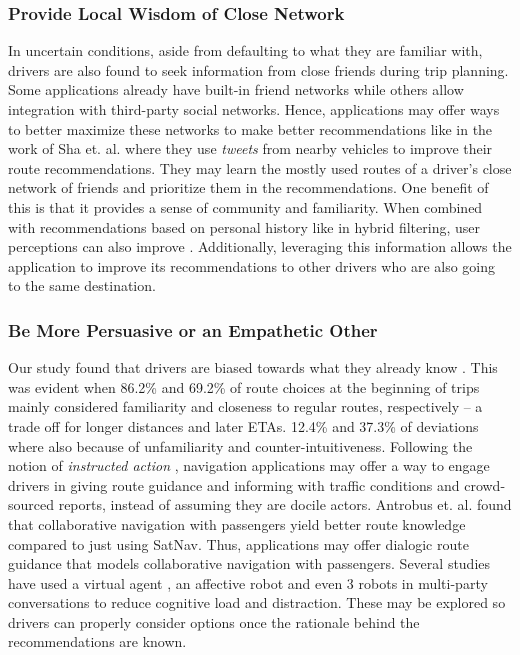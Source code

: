 \subsubsection{Provide Local Wisdom of Close Network}
In uncertain conditions, aside from defaulting to what they are familiar with, drivers are also found to seek information from close friends during trip planning. Some applications already have built-in friend networks while others allow integration with third-party social networks. Hence, applications may offer ways to better maximize these networks to make better recommendations like in the work of Sha et. al. \cite{Sha2013SocialNavigation} where they use \emph{tweets} from nearby vehicles to improve their route recommendations. They may learn the mostly used routes of a driver's close network of friends and prioritize them in the recommendations. One benefit of this is that it provides a sense of community and familiarity. When combined with recommendations based on personal history like in hybrid filtering, user perceptions can also improve \cite{Wu2015HybridSystems}. Additionally, leveraging this information allows the application to improve its recommendations to other drivers who are also going to the same destination. 
 
\subsubsection{Be More Persuasive or an Empathetic Other} 
Our study found that drivers are biased towards what they already know \cite{Patel2006PersonalizingRoutes,Brown2012TheGPS}. This was evident when 86.2\% and 69.2\% of route choices at the beginning of trips mainly considered familiarity and closeness to regular routes, respectively -- a trade off for longer distances and later ETAs. 12.4\% and 37.3\% of deviations where also because of unfamiliarity and counter-intuitiveness. Following the notion of \emph{instructed action} \cite{Brown2012TheGPS}, navigation applications may offer a way to engage drivers in giving route guidance and informing with traffic conditions and crowd-sourced reports, instead of assuming they are docile actors. Antrobus et. al. \cite{Antrobus2017Driver-PassengerSystems} found that collaborative navigation with passengers yield better route knowledge compared to just using SatNav. Thus, applications may offer dialogic route guidance that models collaborative navigation with passengers. Several studies have used a virtual agent \cite{Lin2018Adasa}, an affective robot \cite{Williams2014AffectiveSociability} and even 3 robots in multi-party conversations \cite{Karatas2016NAMIDA:Driver} to reduce cognitive load and distraction. These may be explored so drivers can properly consider options once the rationale behind the recommendations are known. 


